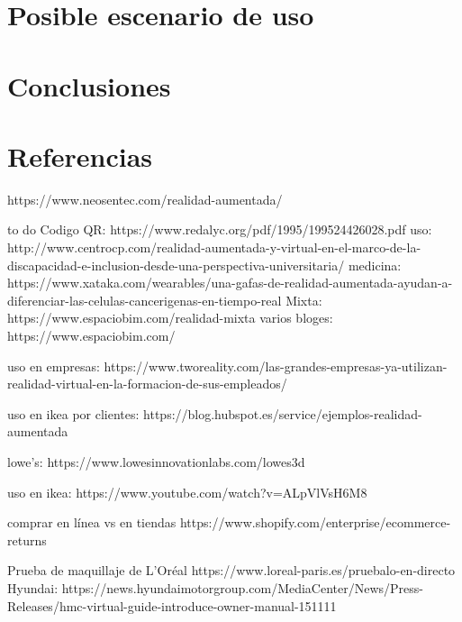 \documentclass[a4paper,11pt]{scrartcl}
\begin{document}

\section{Posible escenario de uso}

\section{Conclusiones}

\section{Referencias}
\printbibliography

https://www.neosentec.com/realidad-aumentada/


to do
Codigo QR:
https://www.redalyc.org/pdf/1995/199524426028.pdf
uso:
http://www.centrocp.com/realidad-aumentada-y-virtual-en-el-marco-de-la-discapacidad-e-inclusion-desde-una-perspectiva-universitaria/
medicina:
https://www.xataka.com/wearables/una-gafas-de-realidad-aumentada-ayudan-a-diferenciar-las-celulas-cancerigenas-en-tiempo-real
Mixta:
https://www.espaciobim.com/realidad-mixta
varios bloges:
https://www.espaciobim.com/

uso en empresas:
https://www.tworeality.com/las-grandes-empresas-ya-utilizan-realidad-virtual-en-la-formacion-de-sus-empleados/

uso en ikea por clientes:
https://blog.hubspot.es/service/ejemplos-realidad-aumentada

lowe's:
https://www.lowesinnovationlabs.com/lowes3d

uso en ikea:
https://www.youtube.com/watch?v=ALpVlVsH6M8

comprar en línea vs en tiendas
https://www.shopify.com/enterprise/ecommerce-returns

Prueba de maquillaje de L'Oréal
https://www.loreal-paris.es/pruebalo-en-directo
Hyundai:
https://news.hyundaimotorgroup.com/MediaCenter/News/Press-Releases/hmc-virtual-guide-introduce-owner-manual-151111
\end{document}
